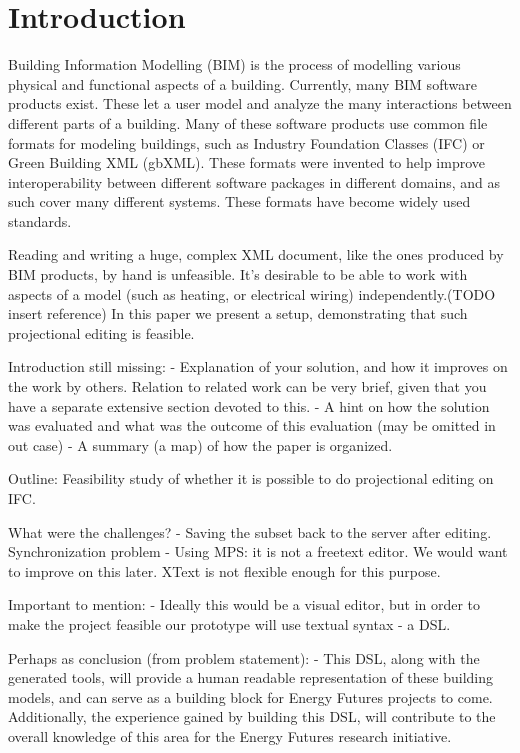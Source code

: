 \setcounter{page}{1}
\section{Introduction}
Building Information Modelling (BIM) is the process of modelling various physical and functional aspects of a building. Currently, many BIM software products exist. These let a user model and analyze the many interactions between different parts of a building. Many of these software products use common file formats for modeling buildings, such as Industry Foundation Classes (IFC) or Green Building XML (gbXML). These formats were invented to help improve interoperability between different software packages in different domains, and as such cover many different systems. These formats have become widely used standards. 

Reading and writing a huge, complex XML document, like the ones produced by BIM products, by hand is unfeasible. It’s desirable to be able to work with aspects of a model (such as heating, or electrical wiring) independently.(TODO insert reference) In this paper we present a setup, demonstrating that such projectional editing is feasible. 

Introduction still missing:
- Explanation of your solution, and how it improves on the work by others. Relation to related work can be very brief, given that you have a separate extensive section devoted to this.
- A hint on how the solution was evaluated and what was the outcome of this evaluation (may be omitted in out case)
- A summary (a map) of how the paper is organized.

\cite{nour08}

Outline:
Feasibility study of whether it is possible to do projectional editing on IFC.

What were the challenges?
- Saving the subset back to the server after editing. Synchronization problem
- Using MPS: it is not a freetext editor. We would want to improve on this later. XText is not flexible enough for this purpose.

Important to mention:
- Ideally this would be a visual editor, but in order to make the project feasible our prototype will use textual syntax - a DSL. 

Perhaps as conclusion (from problem statement):
- This DSL, along with the generated tools, will provide a human readable representation of these building models, and can serve as a building block for Energy Futures projects to come. Additionally, the experience gained by building this DSL, will contribute to the overall knowledge of this area for the Energy Futures research initiative.